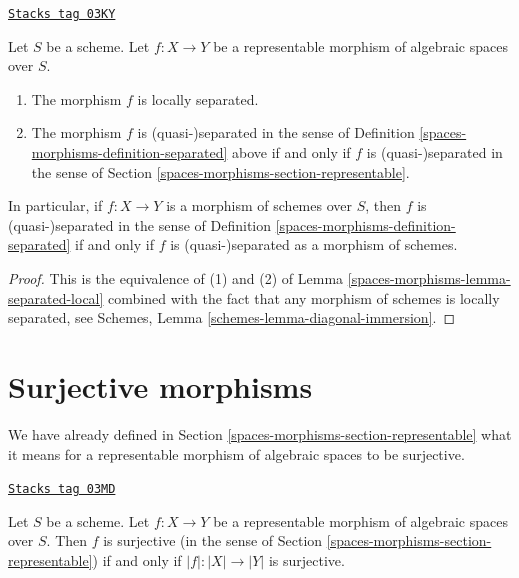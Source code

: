 \begin{lemma}
\label{spaces-morphisms-lemma-match-separated}
\href{https://stacks.math.columbia.edu/tag/03KY}{\texttt{Stacks tag 03KY}}

Let $S$ be a scheme.
Let $f : X \to Y$ be a representable morphism of algebraic spaces over $S$.
\begin{enumerate}
\item The morphism $f$ is locally separated.
\item The morphism $f$ is (quasi-)separated in the sense of
Definition \ref{spaces-morphisms-definition-separated}
above if and only if $f$ is (quasi-)separated in the sense of
Section \ref{spaces-morphisms-section-representable}.
\end{enumerate}
In particular, if $f : X \to Y$ is a morphism of schemes over $S$, then
$f$ is (quasi-)separated in the sense of
Definition \ref{spaces-morphisms-definition-separated}
if and only if $f$ is (quasi-)separated as a morphism of schemes.
\end{lemma}

\begin{proof}
This is the equivalence of (1) and (2) of
Lemma \ref{spaces-morphisms-lemma-separated-local}
combined with the fact that any morphism of schemes is locally separated, see
Schemes, Lemma \ref{schemes-lemma-diagonal-immersion}.
\end{proof}

\section{Surjective morphisms}
\label{spaces-morphisms-section-surjective}
We have already defined in Section \ref{spaces-morphisms-section-representable}
what it means for a representable morphism of algebraic spaces
to be surjective.

\begin{lemma}
\label{spaces-morphisms-lemma-surjective-representable}
\href{https://stacks.math.columbia.edu/tag/03MD}{\texttt{Stacks tag 03MD}}

Let $S$ be a scheme. Let $f : X \to Y$ be a representable
morphism of algebraic spaces over $S$. Then
$f$ is surjective (in the sense of Section \ref{spaces-morphisms-section-representable})
if and only if $|f| : |X| \to |Y|$ is surjective.
\end{lemma}

